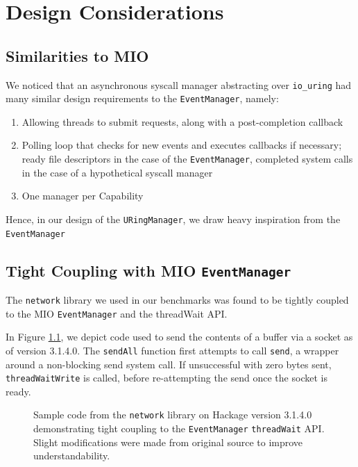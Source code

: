\chapter{Design Considerations}

\section{Similarities to MIO}
We noticed that an asynchronous syscall manager abstracting
over \texttt{io\_uring} had many similar design requirements to
the \texttt{EventManager}, namely:
\begin{enumerate}
	\item Allowing threads to submit requests,
	along with a post-completion callback

	\item Polling loop that checks for new events and
	executes callbacks if necessary; ready file descriptors
	in the case of the \texttt{EventManager}, completed
	system calls in the case of a hypothetical syscall manager

	\item One manager per Capability
\end{enumerate}

Hence, in our design of the \texttt{URingManager},
we draw heavy inspiration from the \texttt{EventManager}

\section{Tight Coupling with MIO \texttt{EventManager}}

The \texttt{network} library we used in our benchmarks was found
to be tightly coupled to the MIO \texttt{EventManager} and the threadWait API.
 
In Figure \ref{fig:networkThreadWait}, we depict code used to send the contents of a buffer
via a socket as of version 3.1.4.0. The \texttt{sendAll} function first attempts
to call \texttt{send}, a wrapper around a non-blocking send system call.
If unsuccessful with zero bytes sent, \texttt{threadWaitWrite} is called,
before re-attempting the send once the socket is ready. 

\begin{figure}[ht]
	\centering
	
	\caption[Sample code from the \texttt{network} library]{
		Sample code from the \texttt{network} library on Hackage
		version 3.1.4.0 demonstrating tight coupling
		to the \texttt{EventManager} \texttt{threadWait} API.
		Slight modifications were made from original source to
		improve understandability.
	}
	\label{fig:networkThreadWait}
\end{figure}
  
